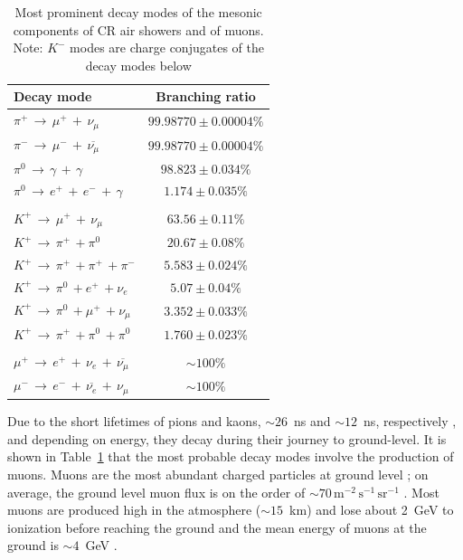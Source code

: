 \begin{table}[ht!]
	\begin{center}
		\caption{ Most prominent decay modes of the mesonic components of CR air showers and of muons. Note: $K^-$ modes are charge conjugates of the decay modes below \citep{particle_data_group_review_2020}}
		\label{tab:meson_decay}
		\begin{tabular}{lc}
			\hline
			Decay mode & Branching ratio  \\
			\hline
			{$ \pi^{+} \, \rightarrow \, \mu^{+} \, + \, \nu_{\mu} $}	 &  $99.98770 \pm 0.00004 \%$ \\
			{$ \pi^{-} \, \rightarrow \, \mu^{-} \, + \, \overline{\nu_{\mu}} $}  &  $99.98770 \pm 0.00004 \% $ \\
			{$ \pi^{0} \, \rightarrow \, \gamma \, + \, \gamma $} &  $98.823 \pm 0.034 \% $ \\
			{$ \pi^{0} \, \rightarrow \, e^+ \, + \, e^-  \, + \, \gamma $} &  $1.174 \pm 0.035 \% $ \\
			{}  & {} \\
			{$K^+ \, \rightarrow \, \mu^{+} \, + \, \nu_{\mu}$}  &  $63.56 \pm 0.11 \% $ \\
			{$K^+ \, \rightarrow \, \pi^{+} \, + \pi^{0} $}  &  $20.67 \pm 0.08 \% $ \\
			{$K^+ \, \rightarrow \, \pi^{+} \, + \pi^{+} \, + \pi^{-}$}  &  $5.583 \pm 0.024 \% $ \\
			{$K^+ \, \rightarrow \, \pi^{0} \, + e^{+} \, + \nu_{e}$}  & $5.07 \pm 0.04 \% $ \\ 		 		 		 		
			{$K^+ \, \rightarrow \, \pi^{0} \, + \mu^{+} \, + \nu_{\mu}$}  &  $3.352 \pm 0.033 \% $\\ 		 		 		 		
			{$K^+ \, \rightarrow \, \pi^{+} \, + \pi^{0} \, + \pi^{0}$}  &  $1.760 \pm 0.023 \% $\\
			{}  & {} \\
			{$ \mu^{+} \, \rightarrow \, e^{+} \, + \, \nu_e \, + \, \overline{\nu_{\mu}} $}  &  $\sim 100\%$\\	
			{$ \mu^{-} \, \rightarrow \, e^{-} \, + \, \overline{\nu_e} \, + \, \nu_{\mu} $}  &  $\sim 100\%$\\	
			\hline
		\end{tabular}
	\end{center}
\end{table}


Due to the short lifetimes of pions and kaons, $\sim26$~ns and $\sim12$~ns, respectively \citep{particle_data_group_review_2020}, and depending on energy, they decay during their journey to ground-level. It is shown in Table~\ref{tab:meson_decay} that the most probable decay modes involve the production of muons. Muons are the most abundant charged particles at ground level \citep{particle_data_group_review_2020}; on average, the ground level muon flux is on the order of $\sim 70 \, \mathrm{m}^{-2}\,\mathrm{s}^{-1}\,\mathrm{sr}^{-1}$ \citep{cecchini_cosmic_2000, blackmore_terrestrial_2015, pereira_ground_2020, particle_data_group_review_2020}. Most muons are produced high in the atmosphere ($\sim15$~km) and lose about 2~GeV to ionization before reaching the ground and the mean energy of muons at the ground is $\sim4$~GeV \citep{particle_data_group_review_2020}.

